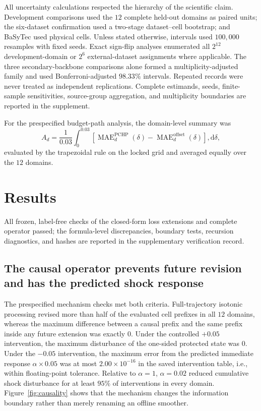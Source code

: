 \documentclass[preprint,12pt]{elsarticle}
\begin{document}
All uncertainty calculations respected the hierarchy of the scientific claim. Development comparisons used the \(12\) complete held-out domains as paired units; the six-dataset confirmation used a two-stage dataset--cell bootstrap; and BaSyTec used physical cells. Unless stated otherwise, intervals used \(100{,}000\) resamples with fixed seeds. Exact sign-flip analyses enumerated all \(2^{12}\) development-domain or \(2^6\) external-dataset assignments where applicable. The three secondary-backbone comparisons alone formed a multiplicity-adjusted family and used Bonferroni-adjusted \(98.33\%\) intervals. Repeated records were never treated as independent replications. Complete estimands, seeds, finite-sample sensitivities, source-group aggregation, and multiplicity boundaries are reported in the supplement.

For the prespecified budget-path analysis, the domain-level summary was
\begin{equation}
A_d=\frac{1}{0.03}\int_{0}^{0.03}
\left[\operatorname{MAE}^{\mathrm{PCHP}}_d(\delta)-
\operatorname{MAE}^{\mathrm{offset}}_d(\delta)\right],\mathrm d\delta,
\label{eq:budget_auc}
\end{equation}
evaluated by the trapezoidal rule on the locked grid and averaged equally over the \(12\) domains.

\section{Results}

All frozen, label-free checks of the closed-form loss extensions and complete operator passed; the formula-level discrepancies, boundary tests, recursion diagnostics, and hashes are reported in the supplementary verification record.

\subsection{The causal operator prevents future revision and has the predicted shock response}

The prespecified mechanism checks met both criteria. Full-trajectory isotonic processing revised more than half of the evaluated cell prefixes in all $12$ domains, whereas the maximum difference between a causal prefix and the same prefix inside any future extension was exactly $0$. Under the controlled $+0.05$ intervention, the maximum disturbance of the one-sided protected state was $0$. Under the $-0.05$ intervention, the maximum error from the predicted immediate response $\alpha\times0.05$ was at most $2.00\times10^{-16}$ in the saved intervention table, i.e., within floating-point tolerance. Relative to $\alpha=1$, $\alpha=0.02$ reduced cumulative shock disturbance for at least $95\%$ of interventions in every domain. Figure~\ref{fig:causality} shows that the mechanism changes the information boundary rather than merely renaming an offline smoother.
\end{document}
